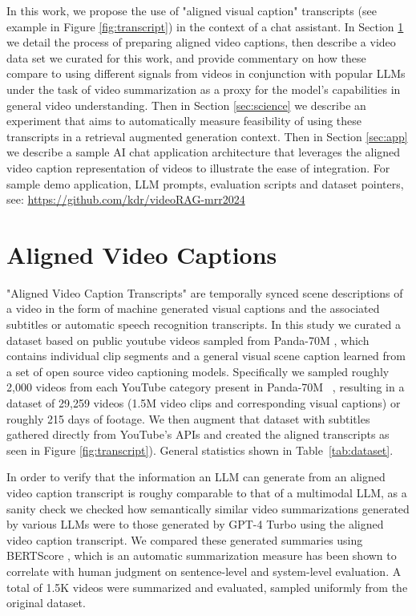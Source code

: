 \documentclass[sigconf]{acmart}
\begin{document}
\begin{CCSXML}
		In this work, we propose the use of "aligned visual caption" transcripts (see example in Figure \ref{fig:transcript}) in the context of a chat assistant. In Section \ref{sec:vc} we detail the process of preparing aligned video captions, then describe a video data set we curated for this work, and provide commentary on how these compare to using different signals from videos in conjunction with popular LLMs under the task of video summarization as a proxy for the model's capabilities in general video understanding. Then in Section \ref{sec:science} we describe an experiment that aims to automatically measure feasibility of using these transcripts in a retrieval augmented generation context. Then in Section \ref{sec:app} we describe a sample AI chat application architecture that leverages the aligned video caption representation of videos to illustrate the ease of integration. For sample demo application, LLM prompts, evaluation scripts and dataset pointers, see: \url{https://github.com/kdr/videoRAG-mrr2024}
		
		\section{Aligned Video Captions}
		\label{sec:vc}
		
		"Aligned Video Caption Transcripts" are temporally synced scene descriptions of a video in the form of machine generated visual captions and the associated subtitles or automatic speech recognition transcripts. In this study we curated a dataset based on public youtube videos sampled from Panda-70M \cite{chen2024panda70m}, which contains individual clip segments and a general visual scene caption learned from a set of open source video captioning models. Specifically we sampled roughly 2,000 videos from each YouTube category present in Panda-70M  ~\citep{chen2024panda70m}, resulting in a dataset of 29,259 videos (1.5M video clips and corresponding visual captions) or roughly 215 days of footage. We then augment that dataset with subtitles gathered directly from YouTube's APIs and created the aligned transcripts as seen in Figure \ref{fig:transcript}).  General statistics shown in Table~\ref{tab:dataset}.
		
		In order to verify that the information an LLM can generate from an aligned video caption transcript is roughy comparable to that of a multimodal LLM, as a sanity check we checked how semantically similar video summarizations generated by various LLMs were to those generated by GPT-4 Turbo using the aligned video caption transcript. We compared these generated summaries using BERTScore \cite{bert-score}, which is an automatic summarization measure has been shown to correlate with human judgment on sentence-level and system-level evaluation. A total of 1.5K videos were summarized and evaluated, sampled uniformly from the original dataset. 
		

\end{CCSXML}
\end{document}
